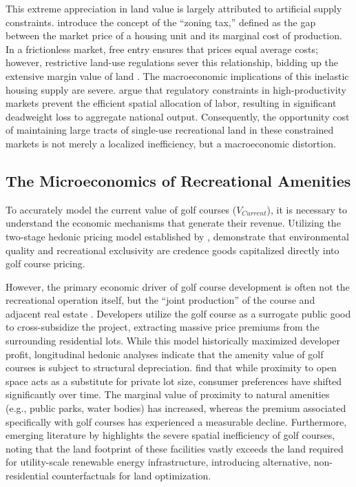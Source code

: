 \documentclass[10pt, letterpaper]{article}
\begin{document}
This extreme appreciation in land value is largely attributed to artificial supply constraints. \textcite{Glaeser2005} introduce the concept of the ``zoning tax,'' defined as the gap between the market price of a housing unit and its marginal cost of production. In a frictionless market, free entry ensures that prices equal average costs; however, restrictive land-use regulations sever this relationship, bidding up the extensive margin value of land \parencite{Gyourko2021}. The macroeconomic implications of this inelastic housing supply are severe. \textcite{Glaeser2017} argue that regulatory constraints in high-productivity markets prevent the efficient spatial allocation of labor, resulting in significant deadweight loss to aggregate national output. Consequently, the opportunity cost of maintaining large tracts of single-use recreational land in these constrained markets is not merely a localized inefficiency, but a macroeconomic distortion.

\subsection{The Microeconomics of Recreational Amenities}
To accurately model the current value of golf courses ($V_{Current}$), it is necessary to understand the economic mechanisms that generate their revenue. Utilizing the two-stage hedonic pricing model established by \textcite{Rosen1974}, \textcite{Limehouse2010} demonstrate that environmental quality and recreational exclusivity are credence goods capitalized directly into golf course pricing. 

However, the primary economic driver of golf course development is often not the recreational operation itself, but the ``joint production'' of the course and adjacent real estate \parencite{Limehouse2012}. Developers utilize the golf course as a surrogate public good to cross-subsidize the project, extracting massive price premiums from the surrounding residential lots. While this model historically maximized developer profit, longitudinal hedonic analyses indicate that the amenity value of golf courses is subject to structural depreciation. \textcite{Cho2009} find that while proximity to open space acts as a substitute for private lot size, consumer preferences have shifted significantly over time. The marginal value of proximity to natural amenities (e.g., public parks, water bodies) has increased, whereas the premium associated specifically with golf courses has experienced a measurable decline. Furthermore, emerging literature by \textcite{Weinand2025} highlights the severe spatial inefficiency of golf courses, noting that the land footprint of these facilities vastly exceeds the land required for utility-scale renewable energy infrastructure, introducing alternative, non-residential counterfactuals for land optimization.
\end{document}
